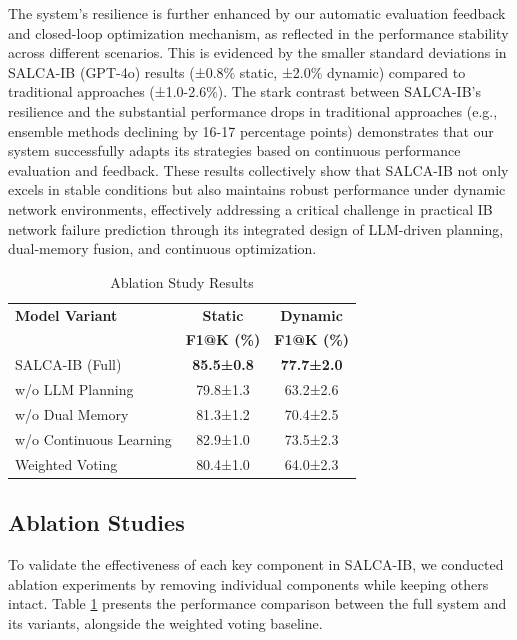 \documentclass[conference]{IEEEtran}
\begin{document}
The system's resilience is further enhanced by our automatic evaluation feedback and closed-loop optimization mechanism, as reflected in the performance stability across different scenarios. This is evidenced by the smaller standard deviations in SALCA-IB (GPT-4o) results (±0.8\% static, ±2.0\% dynamic) compared to traditional approaches (±1.0-2.6\%). The stark contrast between SALCA-IB's resilience and the substantial performance drops in traditional approaches (e.g., ensemble methods declining by 16-17 percentage points) demonstrates that our system successfully adapts its strategies based on continuous performance evaluation and feedback. These results collectively show that SALCA-IB not only excels in stable conditions but also maintains robust performance under dynamic network environments, effectively addressing a critical challenge in practical IB network failure prediction through its integrated design of LLM-driven planning, dual-memory fusion, and continuous optimization.

\begin{table}[!t]
\caption{Ablation Study Results}
\label{tab:ablation}
\renewcommand{\arraystretch}{1.2}
\begin{center}
\begin{tabular}{|l|cc|}
\hline
\textbf{Model Variant} & \textbf{Static} & \textbf{Dynamic} \\
& \textbf{F1@K (\%)} & \textbf{F1@K (\%)} \\
\hline
SALCA-IB (Full) & \textbf{85.5±0.8} & \textbf{77.7±2.0} \\
\hline
w/o LLM Planning & 79.8±1.3 & 63.2±2.6 \\
w/o Dual Memory & 81.3±1.2 & 70.4±2.5 \\
w/o Continuous Learning & 82.9±1.0 & 73.5±2.3 \\
\hline
Weighted Voting & 80.4±1.0 & 64.0±2.3 \\
\hline
\end{tabular}
\end{center}
\end{table}

\subsection{Ablation Studies}
To validate the effectiveness of each key component in SALCA-IB, we conducted ablation experiments by removing individual components while keeping others intact. Table \ref{tab:ablation} presents the performance comparison between the full system and its variants, alongside the weighted voting baseline.
\end{document}
